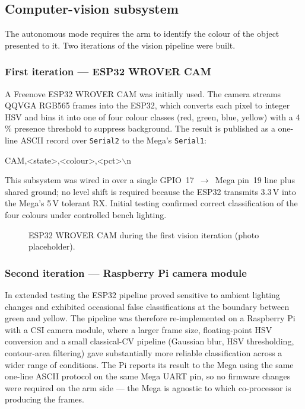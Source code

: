 \subsection{Computer-vision subsystem}
\label{sec:vision}
The autonomous mode requires the arm to identify the colour of the
object presented to it. Two iterations of the vision pipeline were
built.

\subsubsection{First iteration --- ESP32 WROVER CAM}
A Freenove ESP32 WROVER CAM was initially used. The camera
streams QQVGA RGB565 frames into the ESP32, which converts each pixel
to integer HSV and bins it into one of four colour classes (red,
green, blue, yellow) with a 4\,\% presence threshold to suppress
background. The result is published as a one-line ASCII record over
\texttt{Serial2} to the Mega's \texttt{Serial1}:
\begin{center}\ttfamily\small
CAM,<state>,<colour>,<pct>$\backslash$n
\end{center}
This subsystem was wired in over a single GPIO~17~$\rightarrow$~Mega
pin~19 line plus shared ground; no level shift is required because
the ESP32 transmits 3.3\,V into the Mega's 5\,V tolerant RX. Initial
testing confirmed correct classification of the four colours under
controlled bench lighting.

\begin{figure}[t]
  \centering
  \caption{ESP32 WROVER CAM during the first vision iteration
  (photo placeholder).}
  \label{fig:esp32cam}
\end{figure}

\subsubsection{Second iteration --- Raspberry Pi camera module}
In extended testing the ESP32 pipeline proved sensitive to ambient
lighting changes and exhibited occasional false classifications at
the boundary between green and yellow. The pipeline was therefore
re-implemented on a Raspberry Pi with a CSI camera module, where a
larger frame size, floating-point HSV conversion and a small
classical-CV pipeline (Gaussian blur, HSV thresholding,
contour-area filtering) gave substantially more reliable
classification across a wider range of conditions. The Pi reports
its result to the Mega using the same one-line ASCII protocol on
the same Mega UART pin, so no firmware changes were required on
the arm side --- the Mega is agnostic to which co-processor is
producing the frames.

